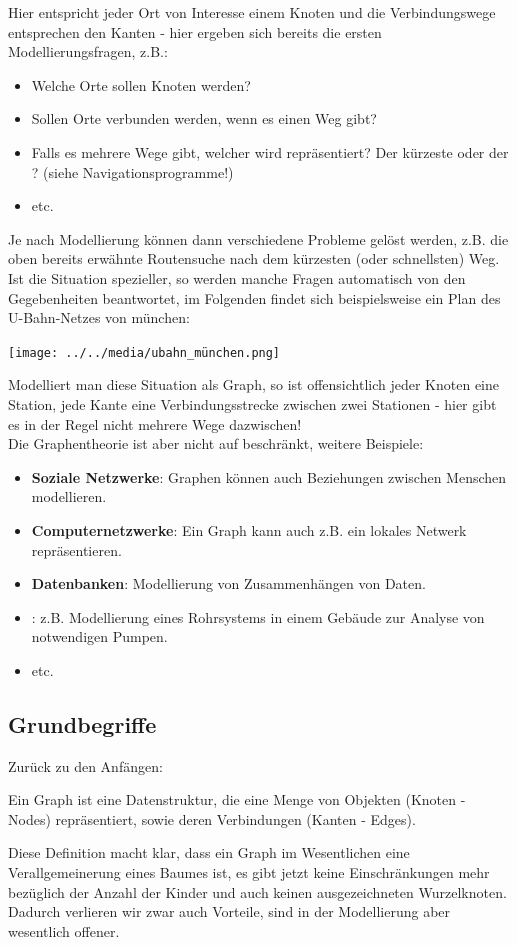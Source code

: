 \documentclass{article}
\begin{document}
Hier entspricht jeder Ort von Interesse einem Knoten und die Verbindungswege entsprechen den Kanten - hier ergeben sich bereits die ersten Modellierungsfragen, z.B.:
\begin{itemize}
    \item Welche Orte sollen Knoten werden?
    \item Sollen Orte verbunden werden, wenn es einen Weg gibt?
    \item Falls es mehrere Wege gibt, welcher wird repräsentiert? Der kürzeste oder der ? (siehe Navigationsprogramme!)
    \item etc.
\end{itemize}
Je nach Modellierung können dann verschiedene Probleme gelöst werden, z.B. die oben bereits erwähnte Routensuche nach dem kürzesten (oder schnellsten) Weg. \\
Ist die Situation spezieller, so werden manche Fragen automatisch von den Gegebenheiten beantwortet, im Folgenden findet sich beispielsweise ein Plan des U-Bahn-Netzes von münchen: 
\begin{center}
    \texttt{[image: ../../media/ubahn\_münchen.png]}
\end{center}
Modelliert man diese Situation als Graph, so ist offensichtlich jeder Knoten eine Station, jede Kante eine Verbindungsstrecke zwischen zwei Stationen - hier gibt es in der Regel nicht mehrere Wege dazwischen! \\
Die Graphentheorie ist aber nicht auf  beschränkt, weitere Beispiele:
\begin{itemize}
    \item \textbf{Soziale Netzwerke}: Graphen können auch Beziehungen zwischen Menschen modellieren.
    \item \textbf{Computernetzwerke}: Ein Graph kann auch z.B. ein lokales Netwerk repräsentieren.
    \item \textbf{Datenbanken}: Modellierung von Zusammenhängen von Daten.
    \item \textbf{}: z.B. Modellierung eines Rohrsystems in einem Gebäude zur Analyse von notwendigen Pumpen.
    \item etc. 
\end{itemize}

\subsection{Grundbegriffe}

Zurück zu den Anfängen:
\begin{defi}
Ein Graph ist eine Datenstruktur, die eine Menge von Objekten (Knoten - Nodes) repräsentiert, sowie deren Verbindungen (Kanten - Edges).
\end{defi}
Diese Definition macht klar, dass ein Graph im Wesentlichen eine Verallgemeinerung eines Baumes ist, es gibt jetzt keine Einschränkungen mehr bezüglich der Anzahl der Kinder und auch keinen ausgezeichneten Wurzelknoten. Dadurch verlieren wir zwar auch Vorteile, sind in der Modellierung aber wesentlich offener. \\
\end{document}
